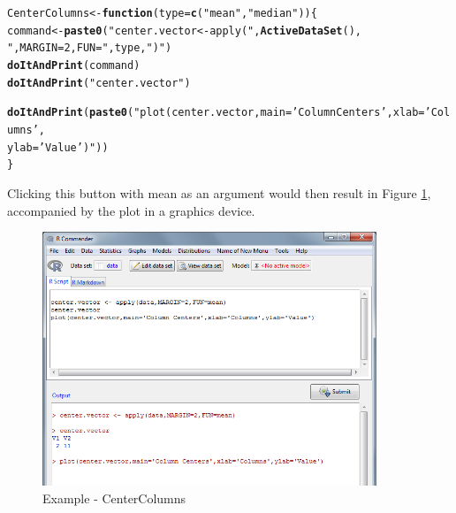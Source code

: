\documentclass[a4paper]{article}\usepackage[]{graphicx}\usepackage[]{color}
\makeatletter
\newcommand{\hlstr}[1]{\textcolor[rgb]{0.192,0.494,0.8}{#1}}%
\newcommand{\hlstd}[1]{\textcolor[rgb]{0.345,0.345,0.345}{#1}}%
\newcommand{\hlkwa}[1]{\textcolor[rgb]{0.161,0.373,0.58}{\textbf{#1}}}%
\newcommand{\hlkwb}[1]{\textcolor[rgb]{0.69,0.353,0.396}{#1}}%
\newcommand{\hlkwc}[1]{\textcolor[rgb]{0.333,0.667,0.333}{#1}}%
\newcommand{\hlkwd}[1]{\textcolor[rgb]{0.737,0.353,0.396}{\textbf{#1}}}%
\newenvironment{kframe}{%
 \def\at@end@of@kframe{}%
 \ifinner\ifhmode%
  \def\at@end@of@kframe{\end{minipage}}%
  \begin{minipage}{\columnwidth}%
 \fi\fi%
 \def\FrameCommand##1{\hskip\@totalleftmargin \hskip-\fboxsep
 \colorbox{shadecolor}{##1}\hskip-\fboxsep
     \hskip-\linewidth \hskip-\@totalleftmargin \hskip\columnwidth}%
 \MakeFramed {\advance\hsize-\width
   \@totalleftmargin\z@ \linewidth\hsize
   \@setminipage}}%
 {\par\unskip\endMakeFramed%
 \at@end@of@kframe}
\newenvironment{knitrout}{}{} %
\makeatother
\begin{document}
\begin{knitrout}
\color{fgcolor}\begin{kframe}
\begin{alltt}
\hlstd{CenterColumns} \hlkwb{<-} \hlkwa{function}\hlstd{(}\hlkwc{type}\hlstd{=}\hlkwd{c}\hlstd{(}\hlstr{"mean"}\hlstd{,}\hlstr{"median"}\hlstd{))\{}
        \hlstd{command} \hlkwb{<-} \hlkwd{paste0}\hlstd{(}\hlstr{"center.vector <- apply("}\hlstd{,}\hlkwd{ActiveDataSet}\hlstd{(),}
                                       \hlstr{",MARGIN=2,FUN="}\hlstd{,type,}\hlstr{")"}\hlstd{)}
        \hlkwd{doItAndPrint}\hlstd{(command)}
        \hlkwd{doItAndPrint}\hlstd{(}\hlstr{"center.vector"}\hlstd{)}

        \hlkwd{doItAndPrint}\hlstd{(}\hlkwd{paste0}\hlstd{(}\hlstr{"plot(center.vector,main='Column Centers',xlab='Columns',
                               ylab='Value')"}\hlstd{))}
\hlstd{\}}
\end{alltt}
\end{kframe}
\end{knitrout}
\noindent Clicking this button with mean as an argument would then result in
Figure \ref{doitandprint_example}, accompanied by the plot in a graphics device.
\begin{figure}[H]
\centering
\includegraphics[width=10cm]{figures/doitandprint_example.png}
\caption{Example - CenterColumns \label{doitandprint_example}}
\end{figure}
\end{document}
